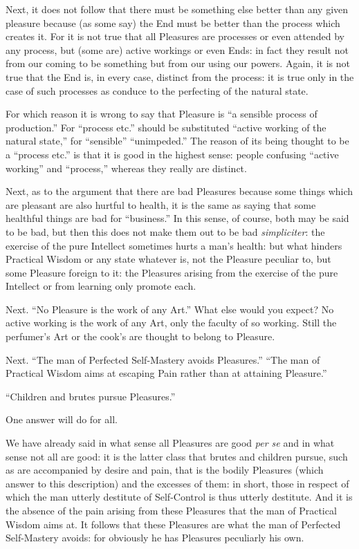Next, it does not follow that there must be something else better than any
given pleasure because (as some say) the End must be better than the process
which creates it. For it is not true that all Pleasures are processes or even
attended by any process, but (some are) active workings or even Ends: in fact
they result not from our coming to be something but from our using our powers.
Again, it is not true that the End is, in every case, distinct from the
process: it is true only in the case of such processes as conduce to the
perfecting of the natural state.

For which reason it is wrong to say that Pleasure is “a sensible process
of production.” For “process etc.” should be substituted
“active working of the natural state,” for “sensible”
“unimpeded.” The reason of its being thought to be a “process
etc.” is that it is good in the highest sense: people confusing
“active working” and “process,” whereas they really are
distinct.

Next, as to the argument that there are bad Pleasures because some things which
are pleasant are also hurtful to health, it is the same as saying that some
healthful things are bad for “business.” In this sense, of course,
both may be said to be bad, but then this does not make them out to be bad
\emph{simpliciter}: the exercise of the pure Intellect sometimes hurts a
man’s health: but what hinders Practical Wisdom or any state whatever is,
not the Pleasure peculiar to, but some Pleasure foreign to it: the Pleasures
arising from the exercise of the pure Intellect or from learning only promote
each.

Next. “No Pleasure is the work of any Art.” What else would you
expect? No active working is the work of any Art, only the faculty of so
working. Still the perfumer’s Art or the cook’s are thought to
belong to Pleasure.

Next. “The man of Perfected Self-Mastery avoids Pleasures.”
“The man of Practical Wisdom aims at escaping Pain rather than at
attaining Pleasure.”

“Children and brutes pursue Pleasures.”

One answer will do for all.

We have already said in what sense all Pleasures are good \emph{per se} and in
what sense not all are good: it is the latter class that brutes and children
pursue, such as are accompanied by desire and pain, that is the bodily
Pleasures (which answer to this description) and the excesses of them: in
short, those in respect of which the man utterly destitute of Self-Control is
thus utterly destitute. And it is the absence of the pain arising from these
Pleasures that the man of Practical Wisdom aims at. It follows that these
Pleasures are what the man of Perfected Self-Mastery avoids: for obviously he
has Pleasures peculiarly his own.

